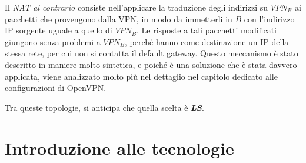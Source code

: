 Il \textit{NAT al contrario} consiste nell'applicare la traduzione degli indirizzi su $VPN_B$
ai pacchetti che provengono dalla VPN, in modo da immetterli in $B$ con l'indirizzo IP
sorgente uguale a quello di $VPN_B$. Le risposte a tali pacchetti modificati giungono 
senza problemi a $VPN_B$, perché hanno come destinazione un IP della stessa rete, per cui non
si contatta il default gateway.
Questo meccanismo è stato descritto in maniere molto sintetica, e poiché è una soluzione che è stata
davvero applicata, viene analizzato molto più nel dettaglio nel capitolo dedicato alle configurazioni
di OpenVPN.

Tra queste topologie, si anticipa che quella scelta è \textbf{\textit{LS}}.



\section{Introduzione alle tecnologie}

